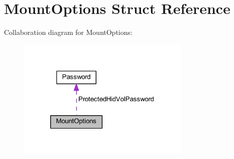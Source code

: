\hypertarget{struct_mount_options}{}\section{Mount\+Options Struct Reference}
\label{struct_mount_options}


Collaboration diagram for Mount\+Options\+:
\nopagebreak
\begin{figure}[H]
\begin{center}
\leavevmode
\includegraphics[width=236pt]{struct_mount_options__coll__graph}
\end{center}
\end{figure}
